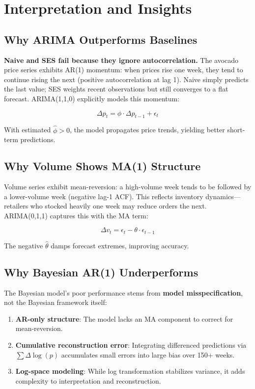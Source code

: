 \documentclass[12pt]{article}
\begin{document}
\section{Interpretation and Insights}
\label{sec:insights}

\subsection{Why ARIMA Outperforms Baselines}

\textbf{Naive and SES fail because they ignore autocorrelation.} The avocado price series exhibits AR(1) momentum: when prices rise one week, they tend to continue rising the next (positive autocorrelation at lag 1). Naive simply predicts the last value; SES weights recent observations but still converges to a flat forecast. ARIMA(1,1,0) explicitly models this momentum:

\begin{equation}
\Delta p_t = \phi \cdot \Delta p_{t-1} + \epsilon_t
\end{equation}

With estimated $\hat{\phi} > 0$, the model propagates price trends, yielding better short-term predictions.

\subsection{Why Volume Shows MA(1) Structure}

Volume series exhibit mean-reversion: a high-volume week tends to be followed by a lower-volume week (negative lag-1 ACF). This reflects inventory dynamics---retailers who stocked heavily one week may reduce orders the next. ARIMA(0,1,1) captures this with the MA term:

\begin{equation}
\Delta v_t = \epsilon_t - \theta \cdot \epsilon_{t-1}
\end{equation}

The negative $\hat{\theta}$ damps forecast extremes, improving accuracy.

\subsection{Why Bayesian AR(1) Underperforms}

The Bayesian model's poor performance stems from \textbf{model misspecification}, not the Bayesian framework itself:

\begin{enumerate}
    \item \textbf{AR-only structure}: The model lacks an MA component to correct for mean-reversion.
    \item \textbf{Cumulative reconstruction error}: Integrating differenced predictions via $\sum \Delta \log(p)$ accumulates small errors into large bias over 150+ weeks.
    \item \textbf{Log-space modeling}: While log transformation stabilizes variance, it adds complexity to interpretation and reconstruction.
\end{enumerate}
\end{document}
